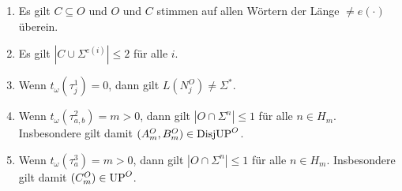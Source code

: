 \begin{claim}\label{claim:myoracle-structure}
    \begin{enumerate}[midpenalty=0,beginpenalty=0,endpenalty=0]
        \item Es gilt $C\subseteq O$ und $O$ und $C$ stimmen auf allen Wörtern der Länge $\neq e(\cdot)$ überein.
        \item Es gilt $|C\cup\Sigma^{e(i)}|\leq 2$ für alle $i$.
        \item Wenn $t_\omega(\tau^1_j)=0$, dann gilt $L(N_j^O)\neq\Sigma^*$.
        \item Wenn $t_\omega(\tau^2_{a,b})=m>0$, dann gilt $|O\cap \Sigma^n|\leq 1$ für alle $n\in H_m$. Insbesondere gilt damit $(A_m^O, B_m^O)\in\mathrm{DisjUP}^O$.
        \item Wenn $t_\omega(\tau^3_{a})=m>0$, dann gilt $|O\cap \Sigma^n|\leq 1$ für alle $n\in H_m$. Insbesondere gilt damit $(C_m^O)\in\mathrm{UP}^O$.
    \end{enumerate}
\end{claim}
